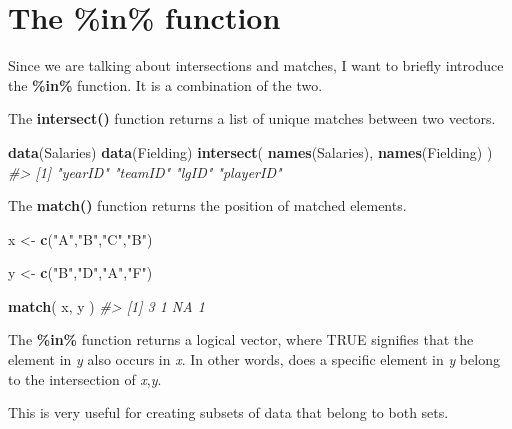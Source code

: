 \documentclass[]{book}
\newenvironment{Shaded}{\begin{snugshade}}{\end{snugshade}}
\newcommand{\CommentTok}[1]{\textcolor[rgb]{0.56,0.35,0.01}{\textit{#1}}}
\newcommand{\KeywordTok}[1]{\textcolor[rgb]{0.13,0.29,0.53}{\textbf{#1}}}
\newcommand{\NormalTok}[1]{#1}
\newcommand{\StringTok}[1]{\textcolor[rgb]{0.31,0.60,0.02}{#1}}
\theoremstyle{definition}
\theoremstyle{definition}
\theoremstyle{definition}
\theoremstyle{remark}
\begin{document}
\hypertarget{the-in-function}{%
\section{The \%in\% function}\label{the-in-function}}

Since we are talking about intersections and matches, I want to briefly
introduce the \textbf{\%in\%} function. It is a combination of the two.

The \textbf{intersect()} function returns a list of unique matches
between two vectors.

\begin{Shaded}
\begin{Highlighting}[]
\KeywordTok{data}\NormalTok{(Salaries)}
\KeywordTok{data}\NormalTok{(Fielding)}
\KeywordTok{intersect}\NormalTok{( }\KeywordTok{names}\NormalTok{(Salaries), }\KeywordTok{names}\NormalTok{(Fielding) )}
\CommentTok{#> [1] "yearID"   "teamID"   "lgID"     "playerID"}
\end{Highlighting}
\end{Shaded}

The \textbf{match()} function returns the position of matched elements.

\begin{Shaded}
\begin{Highlighting}[]
\NormalTok{x <-}\StringTok{ }\KeywordTok{c}\NormalTok{(}\StringTok{"A"}\NormalTok{,}\StringTok{"B"}\NormalTok{,}\StringTok{"C"}\NormalTok{,}\StringTok{"B"}\NormalTok{)}

\NormalTok{y <-}\StringTok{ }\KeywordTok{c}\NormalTok{(}\StringTok{"B"}\NormalTok{,}\StringTok{"D"}\NormalTok{,}\StringTok{"A"}\NormalTok{,}\StringTok{"F"}\NormalTok{)}

\KeywordTok{match}\NormalTok{( x, y )}
\CommentTok{#> [1]  3  1 NA  1}
\end{Highlighting}
\end{Shaded}

The \textbf{\%in\%} function returns a logical vector, where TRUE
signifies that the element in \emph{y} also occurs in \emph{x}. In other
words, does a specific element in \emph{y} belong to the intersection of
\emph{x},\emph{y}.

This is very useful for creating subsets of data that belong to both
sets.
\end{document}

